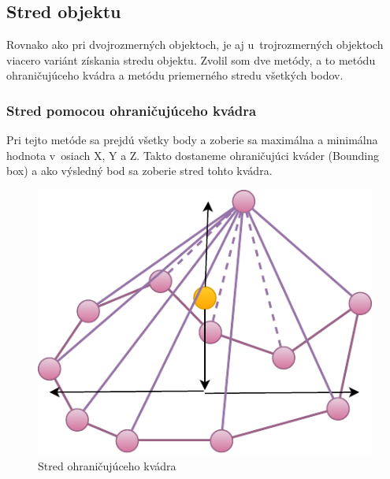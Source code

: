 
\subsection*{Stred objektu}

Rovnako ako pri dvojrozmerných objektoch, je aj u~trojrozmerných objektoch viacero variánt získania stredu objektu. Zvolil som dve metódy, a to metódu ohraničujúceho kvádra a metódu priemerného stredu všetkých bodov.


\subsubsection{Stred pomocou ohraničujúceho kvádra}
Pri tejto metóde sa prejdú všetky body a zoberie sa maximálna a minimálna hodnota v~osiach X, Y a Z. Takto dostaneme ohraničujúci kváder (Bounding box) a ako výsledný bod sa zoberie stred tohto kvádra.
		
\begin{figure}[H]
	\centering
	\includegraphics[height=0.3\textwidth]{obrazky-figures/Diagram/Draw/1Points/DP Navrh operacii-0D - PointMiddle of 3D object.pdf}
	\caption{Stred ohraničujúceho kvádra}
	\label{fig:PointMiddle of 3D object}
\end{figure}










